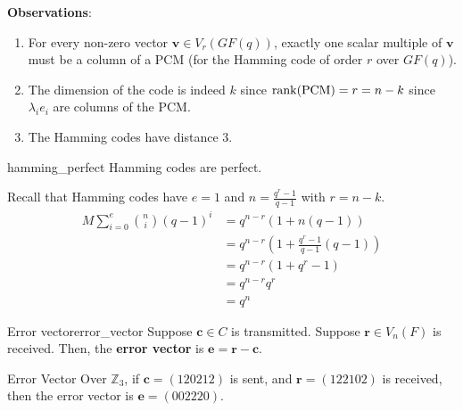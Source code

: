 \textbf{Observations}:
\begin{enumerate}[label=(\roman*)]
    \item For every non-zero vector $ \symbf{v}\in V_r(GF(q)) $, exactly one scalar multiple of $ \symbf{v} $
          must be a column of a PCM (for the Hamming code of order $ r $ over $ GF(q) $).
    \item The dimension of the code is indeed $ k $ since $ \operatorname{rank}(\text{PCM})=r=n-k $
          since $ \lambda_i e_i $ are columns of the PCM\@.
    \item The Hamming codes have distance 3.
\end{enumerate}

\begin{Theorem}{}{hamming_perfect}
    Hamming codes are perfect.
\end{Theorem}

\begin{Proof}{}{}
    Recall that Hamming codes have $ e=1 $ and $ n=\frac{q^r-1}{q-1} $ with $ r=n-k $.
    \begin{align*}
        M \sum\limits_{i=0}^{e} \binom{n}{i}(q-1)^i
         & =q^{n-r}(1+n(q-1))                               \\
         & =q^{n-r}\left( 1+\frac{q^r-1}{q-1} (q-1) \right) \\
         & = q^{n-r}(1+q^r-1)                               \\
         & =q^{n-r}q^r                                      \\
         & =q^n
    \end{align*}
\end{Proof}

\begin{Definition}{Error vector}{error_vector}
    Suppose $ \symbf{c}\in C $ is transmitted. Suppose $ \symbf{r}\in V_n(F) $ is received.
    Then, the \textbf{error vector} is $ \symbf{e}=\symbf{r}-\symbf{c} $.
\end{Definition}

\begin{Example}{Error Vector}{}
    Over $ \mathbb{Z}_3 $, if $ \symbf{c}=(120212) $ is sent, and $ \symbf{r}=(122102) $ is received, then
    the error vector is $ \symbf{e}=(002220) $.
\end{Example}
